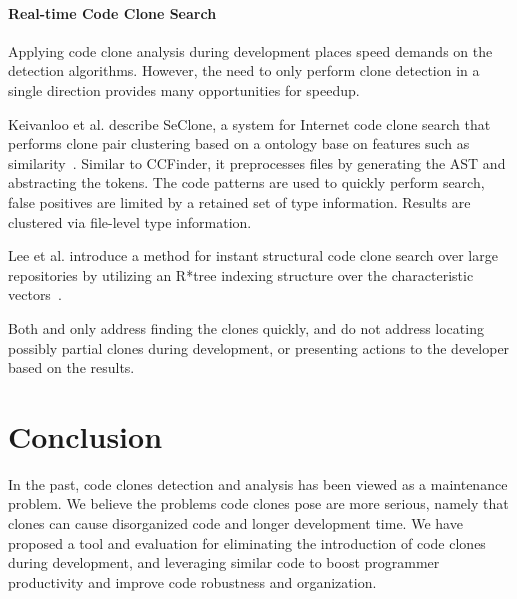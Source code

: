 \documentclass[preprint,10pt]{sigplanconf}
\begin{document}
\paragraph{Real-time Code Clone Search}

Applying code clone analysis during development places speed demands
on the detection algorithms. However, the need to only perform clone
detection in a single direction provides many opportunities for
speedup.

Keivanloo et al. describe SeClone, a system for Internet code clone
search that performs clone pair clustering based on a ontology base on
features such as similarity~\cite{Keivanloo2011}. Similar to CCFinder,
it preprocesses files by generating the AST and abstracting the
tokens. The code patterns are used to quickly perform search, false
positives are limited by a retained set of type information. Results
are clustered via file-level type information.

Lee et al. introduce a method for instant structural code clone search
over large repositories by utilizing an R*tree indexing structure over
the characteristic vectors~\cite{Lee2010}.

Both \cite{Keivanloo2011} and \cite{Lee2010} only address finding the
clones quickly, and do not address locating possibly partial clones
during development, or presenting actions to the developer based on
the results.

\section{Conclusion}
\label{sec:conclusion}

In the past, code clones detection and analysis has been viewed as a
maintenance problem. 
We believe the problems code clones pose are 
more serious, namely that clones can cause disorganized code and
longer development time.
We have proposed a tool and evaluation for
eliminating the introduction of code clones during development, and
leveraging similar code to boost programmer productivity and improve
code robustness and organization.

%

%
%
\end{document}
